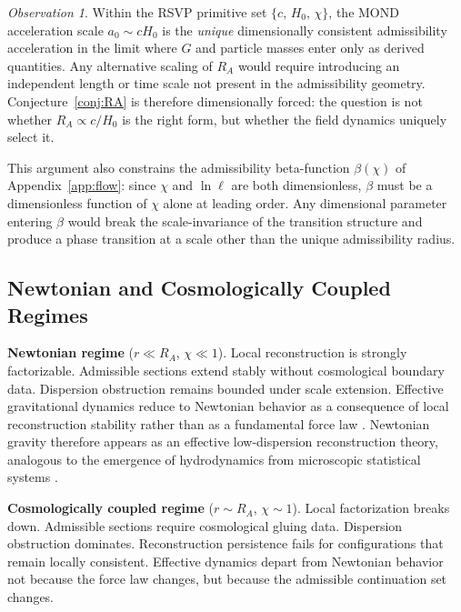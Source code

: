 \documentclass[11pt, a4paper]{article}
\theoremstyle{plain}
\theoremstyle{definition}
\theoremstyle{remark}
\newtheorem{observation}[theorem]{Observation}
\newcommand{\RA}{R_{\!A}}
\begin{document}
\begin{observation}
\label{obs:dimensional}
Within the RSVP primitive set $\{c,\, H_0,\, \chi\}$, the MOND acceleration scale
$a_0 \sim cH_0$ is the \emph{unique} dimensionally consistent admissibility
acceleration in the limit where $G$ and particle masses enter only as derived
quantities. Any alternative scaling of $\RA$ would require introducing an independent
length or time scale not present in the admissibility geometry.
Conjecture~\ref{conj:RA} is therefore dimensionally forced: the question is not
whether $\RA \propto c/H_0$ is the right form, but whether the field dynamics
uniquely select it.
\end{observation}

This argument also constrains the admissibility beta-function $\beta(\chi)$ of
Appendix~\ref{app:flow}: since $\chi$ and $\ln\ell$ are both dimensionless, $\beta$
must be a dimensionless function of $\chi$ alone at leading order. Any dimensional
parameter entering $\beta$ would break the scale-invariance of the transition
structure and produce a phase transition at a scale other than the unique admissibility
radius.

\subsection{Newtonian and Cosmologically Coupled Regimes}

\medskip
\noindent\textbf{Newtonian regime} ($r \ll \RA$, $\chi \ll 1$).\quad
Local reconstruction is strongly factorizable. Admissible sections extend stably
without cosmological boundary data. Dispersion obstruction remains bounded under
scale extension. Effective gravitational dynamics reduce to Newtonian behavior as a
consequence of local reconstruction stability rather than as a fundamental force law
\cite{verlinde2011}. Newtonian gravity therefore appears as an effective
low-dispersion reconstruction theory, analogous to the emergence of hydrodynamics
from microscopic statistical systems \cite{goldenfeld1992}.

\medskip
\noindent\textbf{Cosmologically coupled regime} ($r \sim \RA$, $\chi \sim 1$).\quad
Local factorization breaks down. Admissible sections require cosmological gluing
data. Dispersion obstruction dominates. Reconstruction persistence fails for
configurations that remain locally consistent. Effective dynamics depart from
Newtonian behavior not because the force law changes, but because the admissible
continuation set changes.
\end{document}
